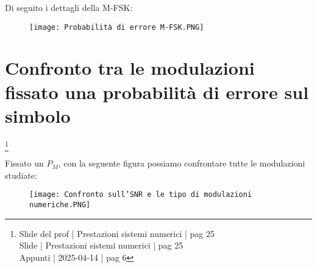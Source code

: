 Di seguito i dettagli della M-FSK: 

\begin{figure}[h]
    \centering
    \texttt{[image: Probabilità di errore M-FSK.PNG]}
\end{figure}

\newpage 

\section{Confronto tra le modulazioni fissato una probabilità di errore sul simbolo}
\footnote{Slide del prof | Prestazioni sistemi numerici | pag 25 \\
Slide | Prestazioni sistemi numerici | pag 25 \\
Appunti | 2025-04-14 | pag 6
}

Fissato un $P_M$, con la seguente figura possiamo confrontare tutte le modulazioni studiate: 

\begin{figure}[h]
    \centering
    \texttt{[image: Confronto sull'SNR e le tipo di modulazioni numeriche.PNG]}
\end{figure}

\newpage 

